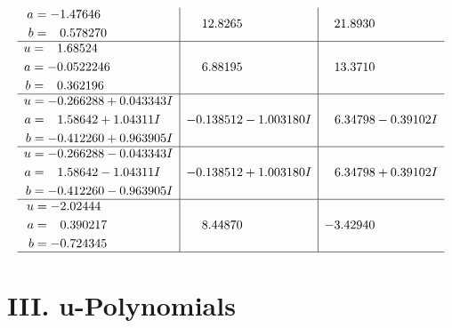 \documentclass[1p]{elsarticle_modified}
\theoremstyle{definition}
\begin{document}
$$\begin{array}{c|c|c}
\begin{aligned}
a &= -1.47646\phantom{ +0.000000I} \\
b &= \phantom{-}0.578270\phantom{ +0.000000I}\end{aligned}
 & \phantom{-}12.8265\phantom{ +0.000000I} & \phantom{-}21.8930\phantom{ +0.000000I} \\ \hline\begin{aligned}
u &= \phantom{-}1.68524\phantom{ +0.000000I} \\
a &= -0.0522246\phantom{ +0.000000I} \\
b &= \phantom{-}0.362196\phantom{ +0.000000I}\end{aligned}
 & \phantom{-}6.88195\phantom{ +0.000000I} & \phantom{-}13.3710\phantom{ +0.000000I} \\ \hline\begin{aligned}
u &= -0.266288 + 0.043343 I \\
a &= \phantom{-}1.58642 + 1.04311 I \\
b &= -0.412260 + 0.963905 I\end{aligned}
 & -0.138512 - 1.003180 I & \phantom{-}6.34798 - 0.39102 I \\ \hline\begin{aligned}
u &= -0.266288 - 0.043343 I \\
a &= \phantom{-}1.58642 - 1.04311 I \\
b &= -0.412260 - 0.963905 I\end{aligned}
 & -0.138512 + 1.003180 I & \phantom{-}6.34798 + 0.39102 I \\ \hline\begin{aligned}
u &= -2.02444\phantom{ +0.000000I} \\
a &= \phantom{-}0.390217\phantom{ +0.000000I} \\
b &= -0.724345\phantom{ +0.000000I}\end{aligned}
 & \phantom{-}8.44870\phantom{ +0.000000I} & -3.42940\phantom{ +0.000000I}\\
 \hline 
 \end{array}$$\newpage
\newpage\renewcommand{\arraystretch}{1}
\centering \section*{ III. u-Polynomials}
\end{document}
